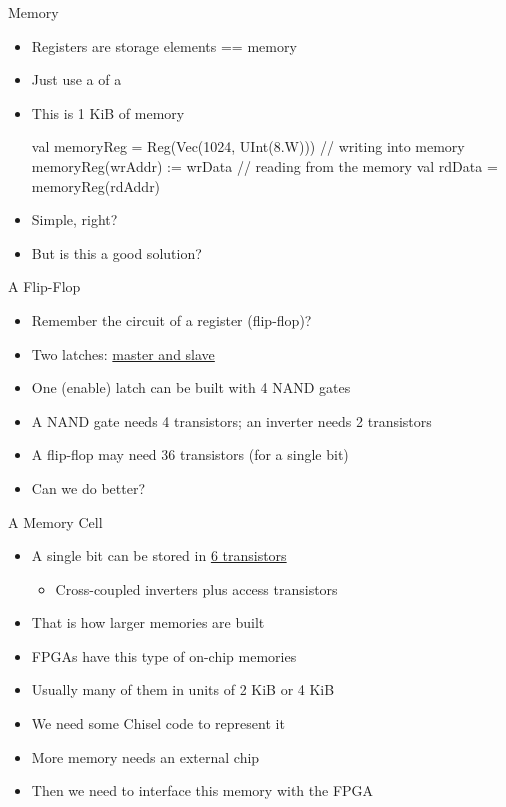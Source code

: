 \begin{frame}[fragile]{Memory}
\begin{itemize}
\item Registers are storage elements == memory
\item Just use a  of a 
\item This is 1 KiB of memory
\begin{chisel}
  val memoryReg = Reg(Vec(1024, UInt(8.W)))
  // writing into memory
  memoryReg(wrAddr) := wrData
  // reading from the memory
  val rdData = memoryReg(rdAddr)
\end{chisel}
\item Simple, right?
\item But is this a good solution?
\end{itemize}
\end{frame}

\begin{frame}[fragile]{A Flip-Flop}
\begin{itemize}
\item Remember the circuit of a register (flip-flop)?
\item Two latches: \href{https://en.wikipedia.org/wiki/Flip-flop_(electronics)#Master%E2%80%93slave_edge-triggered_D_flip-flop}{master and slave}
\item One (enable) latch can be built with 4 NAND gates
\item A NAND gate needs 4 transistors; an inverter needs 2 transistors
\item A flip-flop may need 36 transistors (for a single bit)
\item Can we do better?
\end{itemize}
\end{frame}

\begin{frame}[fragile]{A Memory Cell}
\begin{itemize}
\item A single bit can be stored in \href{https://en.wikipedia.org/wiki/Static_random-access_memory#/media/File:SRAM_Cell_(6_Transistors).svg}{6 transistors}
\begin{itemize}
\item Cross-coupled inverters plus access transistors
\end{itemize}
\item That is how larger memories are built
\item FPGAs have this type of on-chip memories
\item Usually many of them in units of 2 KiB or 4 KiB
\item We need some Chisel code to represent it
\item More memory needs an external chip
\item Then we need to interface this memory with the FPGA
\end{itemize}
\end{frame}

